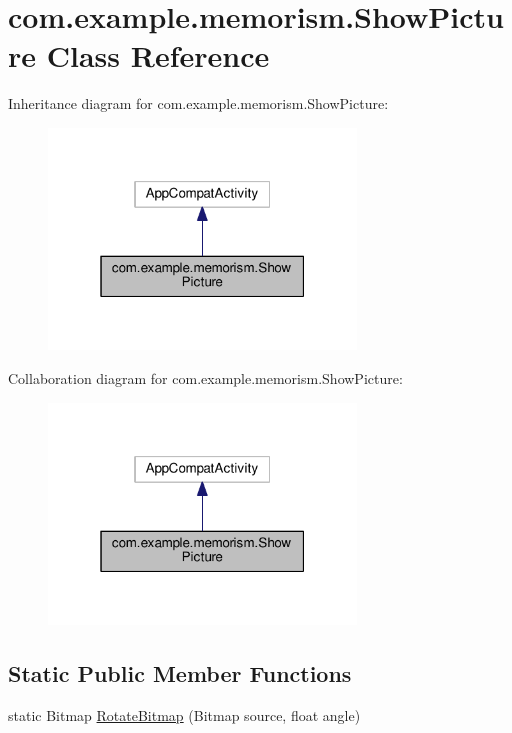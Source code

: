 \hypertarget{classcom_1_1example_1_1memorism_1_1_show_picture}{}\section{com.\+example.\+memorism.\+Show\+Picture Class Reference}
\label{classcom_1_1example_1_1memorism_1_1_show_picture}


Inheritance diagram for com.\+example.\+memorism.\+Show\+Picture\+:\nopagebreak
\begin{figure}[H]
\begin{center}
\leavevmode
\includegraphics[width=232pt]{de/dc0/classcom_1_1example_1_1memorism_1_1_show_picture__inherit__graph}
\end{center}
\end{figure}


Collaboration diagram for com.\+example.\+memorism.\+Show\+Picture\+:\nopagebreak
\begin{figure}[H]
\begin{center}
\leavevmode
\includegraphics[width=232pt]{d2/d9f/classcom_1_1example_1_1memorism_1_1_show_picture__coll__graph}
\end{center}
\end{figure}
\subsection*{Static Public Member Functions}
\begin{DoxyCompactItemize}
\item 
static Bitmap \hyperlink{classcom_1_1example_1_1memorism_1_1_show_picture_abcf63f664625879f223f6decad593f16}{Rotate\+Bitmap} (Bitmap source, float angle)
\end{DoxyCompactItemize}
